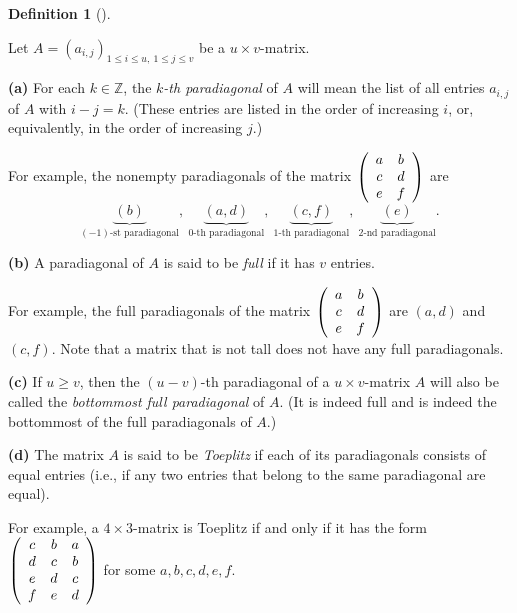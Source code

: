 \documentclass[numbers=enddot,12pt,final,onecolumn,notitlepage]{scrartcl}%
\theoremstyle{definition}
\newtheorem{defi}[theo]{Definition}
\newenvironment{definition}[1][]
{\begin{defi}[#1]\begin{leftbar}}
{\end{leftbar}\end{defi}}
\renewcommand{\leq}{\leqslant}
\renewcommand{\geq}{\geqslant}
\theoremstyle{plainsl}
\begin{document}
\begin{definition}
Let $A=\left(  a_{i,j}\right)  _{1\leq i\leq u,\ 1\leq j\leq v}$ be a $u\times
v$-matrix.

\textbf{(a)} For each $k\in\mathbb{Z}$, the $k$\emph{-th paradiagonal} of $A$
will mean the list of all entries $a_{i,j}$ of $A$ with $i-j=k$. (These
entries are listed in the order of increasing $i$, or, equivalently, in the
order of increasing $j$.)

For example, the nonempty paradiagonals of the matrix $\left(
\begin{array}
[c]{cc}%
a & b\\
c & d\\
e & f
\end{array}
\right)  $ are%
\[
\underbrace{\left(  b\right)  }_{\left(  -1\right)  \text{-st paradiagonal}%
},\ \underbrace{\left(  a,d\right)  }_{0\text{-th paradiagonal}}%
,\ \underbrace{\left(  c,f\right)  }_{1\text{-th paradiagonal}}%
,\ \underbrace{\left(  e\right)  }_{2\text{-nd paradiagonal}}.
\]


\textbf{(b)} A paradiagonal of $A$ is said to be \emph{full} if it has $v$ entries.

For example, the full paradiagonals of the matrix $\left(
\begin{array}
[c]{cc}%
a & b\\
c & d\\
e & f
\end{array}
\right)  $ are $\left(  a,d\right)  $ and $\left(  c,f\right)  $. Note that a
matrix that is not tall does not have any full paradiagonals.

\textbf{(c)} If $u\geq v$, then the $\left(  u-v\right)  $-th paradiagonal of
a $u\times v$-matrix $A$ will also be called the \emph{bottommost full
paradiagonal} of $A$. (It is indeed full and is indeed the bottommost of the
full paradiagonals of $A$.)

\textbf{(d)} The matrix $A$ is said to be \emph{Toeplitz} if each of its
paradiagonals consists of equal entries (i.e., if any two entries that belong
to the same paradiagonal are equal).

For example, a $4\times3$-matrix is Toeplitz if and only if it has the form
$\left(
\begin{array}
[c]{ccc}%
c & b & a\\
d & c & b\\
e & d & c\\
f & e & d
\end{array}
\right)  $ for some $a,b,c,d,e,f$.


\end{definition}
\end{document}
